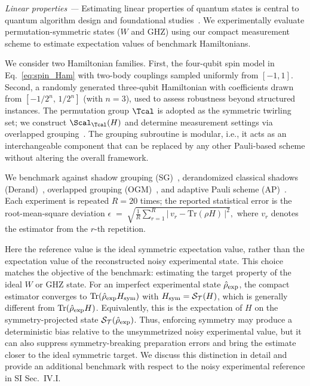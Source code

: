 \documentclass[prl,aps,twocolumn,notitlepage,superscriptaddress,showpacs,nofootinbib]{revtex4-2}
\newcommand{\red}[1]{{\color{red} #1}}
\begin{document}
\textit{Linear properties ---}
Estimating linear properties of quantum states is central to quantum algorithm design and foundational studies~\cite{harrow2009quantum,gross2010quantum,kandala2017hardware,huang2020predicting}. We experimentally evaluate permutation-symmetric states ($W$ and GHZ) using our compact measurement scheme to estimate expectation values of benchmark Hamiltonians.

We consider two Hamiltonian families. First, the four-qubit spin model in Eq.~\eqref{eq:spin_Ham} with two-body couplings sampled uniformly from $[-1,1]$. Second, a randomly generated three-qubit Hamiltonian with coefficients drawn from $[-1/2^n,\,1/2^n]$ (with $n=3$), used to assess robustness beyond structured instances. The permutation group $\Tcal$ is adopted as the symmetric twirling set; we construct $\Scal_{\Tcal}(H)$ and determine measurement settings via overlapped grouping~\cite{wu2023overlapped}. The grouping subroutine is modular, \red{i.e., it acts as an interchangeable component that can be replaced by any other Pauli-based scheme without altering the overall framework.}

We benchmark against shadow grouping (SG)~\cite{gresch2025guaranteed}, derandomized classical shadows (Derand)~\cite{Huang2021Efficient}, overlapped grouping (OGM)~\cite{wu2023overlapped}, and adaptive Pauli scheme (AP)~\cite{Shlosberg2023Adaptive}. Each experiment is repeated $R=20$ times; the reported statistical error is the root-mean-square deviation $\epsilon \;=\; \sqrt{\frac{1}{R}\sum_{r=1}^{R}\!\bigl|\,v_r - \mathrm{Tr}(\rho H)\,\bigr|^{2}},
$ where $v_r$ denotes the estimator from the $r$-th repetition. 

\red{
Here the reference value is the ideal symmetric expectation value, rather than 
the expectation value of the reconstructed noisy experimental state. This choice 
matches the objective of the benchmark: estimating the target property of the 
ideal $W$ or GHZ state. For an imperfect experimental state 
$\hat{\rho}_{\rm exp}$, the compact estimator converges to 
$\operatorname{Tr}(\hat{\rho}_{\rm exp}H_{\rm sym})$ with 
$H_{\rm sym}=\mathcal{S}_{\mathcal T}(H)$, which is generally different from 
$\operatorname{Tr}(\hat{\rho}_{\rm exp}H)$. Equivalently, this is the expectation 
of $H$ on the symmetry-projected state 
$\mathcal{S}_{\mathcal T}(\hat{\rho}_{\rm exp})$. Thus, enforcing symmetry may 
produce a deterministic bias relative to the unsymmetrized noisy experimental 
value, but it can also suppress symmetry-breaking preparation errors and bring 
the estimate closer to the ideal symmetric target. We discuss this distinction 
in detail and provide an additional benchmark with respect to the noisy 
experimental reference in SI Sec.~IV.I.
}
\end{document}
